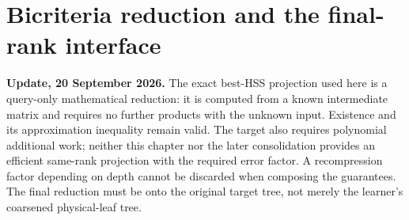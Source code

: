 \documentclass[11pt,oneside,openany,a4paper]{book}
\numberwithin{equation}{chapter}
\theoremstyle{definition}
\theoremstyle{remark}
\newcommand{\proofstep}[1]{\par\addvspace{.45\baselineskip}\Needspace{3\baselineskip}\textbf{#1}\par\nobreak}
\newcommand{\R}{\mathbb R}\newcommand{\E}{\mathbb E}\newcommand{\Prb}{\mathbb P}\newcommand{\PP}{\mathbb P}
\newcommand{\T}{\mathsf T}\newcommand{\Id}{I}
\newcommand{\F}[1]{\left\lVert#1\right\rVert_F}
\newcommand{\N}[1]{\left\lVert#1\right\rVert}
\newcommand{\op}[1]{\left\lVert#1\right\rVert_{\rm op}}
\newcommand{\ip}[2]{\left\langle#1,#2\right\rangle_F}
\DeclareMathOperator{\tr}{tr}\DeclareMathOperator{\rank}{rank}
\DeclareMathOperator{\diag}{blockdiag}\DeclareMathOperator{\range}{range}
\DeclareMathOperator{\HSS}{HSS}\DeclareMathOperator{\dist}{dist}
\DeclareMathOperator{\Var}{Var}\DeclareMathOperator{\supp}{supp}
\newcommand{\UC}{\mathcal U}\newcommand{\VC}{\mathcal V}\newcommand{\err}{\mathcal E}
\newcommand{\Sn}[2]{\left\lVert#1\right\rVert_{S_{#2}}}
\newcommand{\Cov}{\mathsf C}\newcommand{\Loss}{\mathsf L}\newcommand{\Fil}{\mathcal F}
\DeclareMathOperator{\diver}{div}\DeclareMathOperator{\vecop}{vec}\DeclareMathOperator{\Gammafun}{Gamma}
\begin{document}
\begingroup
\let\R\relax
\newcommand{\R}{\mathbb R}
\let\E\relax
\newcommand{\E}{\mathbb E}
\let\Prb\relax
\newcommand{\Prb}{\mathbb P}
\let\T\relax
\newcommand{\T}{\mathsf T}
\let\F\relax
\newcommand{\F}[1]{\left\lVert#1\right\rVert_{F}}
\let\N\relax
\newcommand{\N}[1]{\left\lVert#1\right\rVert}
\let\ip\relax
\newcommand{\ip}[2]{\left\langle#1,#2\right\rangle_F}
\let\tr\relax
\newcommand{\tr}{\operatorname{tr}}
\let\rank\relax
\newcommand{\rank}{\operatorname{rank}}
\let\diag\relax
\newcommand{\diag}{\operatorname{blockdiag}}
\let\range\relax
\newcommand{\range}{\operatorname{range}}
\let\OPT\relax
\newcommand{\OPT}{\operatorname{OPT}}
\let\HSS\relax
\newcommand{\HSS}{\operatorname{HSS}}
\let\diver\relax
\newcommand{\diver}{\operatorname{div}}
\let\Var\relax
\newcommand{\Var}{\operatorname{Var}}
\let\UC\relax
\newcommand{\UC}{\mathcal U}
\let\VC\relax
\newcommand{\VC}{\mathcal V}
\let\err\relax
\newcommand{\err}{\mathcal E}
\let\proofstep\relax
\newcommand{\proofstep}[1]{\par\addvspace{.45\baselineskip}\Needspace{3\baselineskip}\textbf{#1}\par\nobreak}
\let\op\relax
\newcommand{\op}[1]{\left\lVert#1\right\rVert_{\mathrm{op}}}
\let\Sn\relax
\newcommand{\Sn}[2]{\left\lVert#1\right\rVert_{S_{#2}}}
\let\Cov\relax
\newcommand{\Cov}{\mathsf C}
\let\Loss\relax
\newcommand{\Loss}{\mathsf L}
\let\Fil\relax
\newcommand{\Fil}{\mathcal F}
\let\Id\relax
\newcommand{\Id}{I}
\let\supp\relax
\newcommand{\supp}{\operatorname{supp}}
\let\vecop\relax
\newcommand{\vecop}{\operatorname{vec}}
\let\Gammafun\relax
\newcommand{\Gammafun}{\operatorname{Gamma}}
\chapter{Bicriteria reduction and the final-rank interface}\label{ch:bicriteria}
\begin{scopebox}
\textbf{Update, 20 September 2026.} The exact best-HSS projection used here is a query-only mathematical reduction: it is computed from a known intermediate matrix and requires no further products with the unknown input. Existence and its approximation inequality remain valid. The target also requires polynomial additional work; neither this chapter nor the later consolidation provides an efficient same-rank projection with the required error factor. A recompression factor depending on depth cannot be discarded when composing the guarantees. The final reduction must be onto the original target tree, not merely the learner's coarsened physical-leaf tree.
\end{scopebox}
\end{document}
